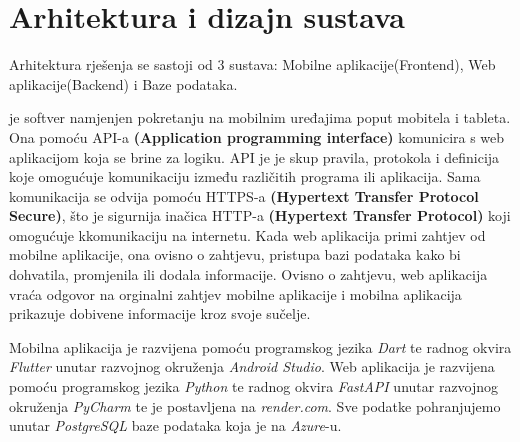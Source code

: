 \chapter{Arhitektura i dizajn sustava}
		

	
		{Arhitektura rješenja se sastoji od 3 sustava: Mobilne aplikacije(Frontend), Web aplikacije(Backend) i Baze podataka.}
		
		{ je softver namjenjen pokretanju na mobilnim uređajima poput mobitela i tableta. Ona pomoću API-a \textbf{(Application programming interface)} komunicira s web aplikacijom koja se brine za logiku. API je je skup pravila, protokola i definicija koje omogućuje komunikaciju između različitih programa ili aplikacija. Sama komunikacija se odvija pomoću HTTPS-a \textbf{(Hypertext Transfer Protocol Secure)}, što je sigurnija inačica HTTP-a \textbf{(Hypertext Transfer Protocol)} koji omogućuje kkomunikaciju na internetu. Kada web aplikacija primi zahtjev od mobilne aplikacije, ona ovisno o zahtjevu, pristupa bazi podataka kako bi dohvatila, promjenila ili dodala informacije. Ovisno o zahtjevu, web aplikacija vraća odgovor na orginalni zahtjev mobilne aplikacije i mobilna aplikacija prikazuje dobivene informacije kroz svoje sučelje.}
		
		{Mobilna aplikacija je razvijena pomoću programskog jezika \textit{Dart} te radnog okvira \textit{Flutter} unutar razvojnog okruženja \textit{Android Studio}. Web aplikacija je razvijena pomoću programskog jezika \textit{Python} te radnog okvira \textit{FastAPI} unutar razvojnog okruženja \textit{PyCharm} te je postavljena na \textit{render.com}. Sve podatke pohranjujemo unutar \textit{PostgreSQL} baze podataka koja je na \textit{Azure}-u.}
		
